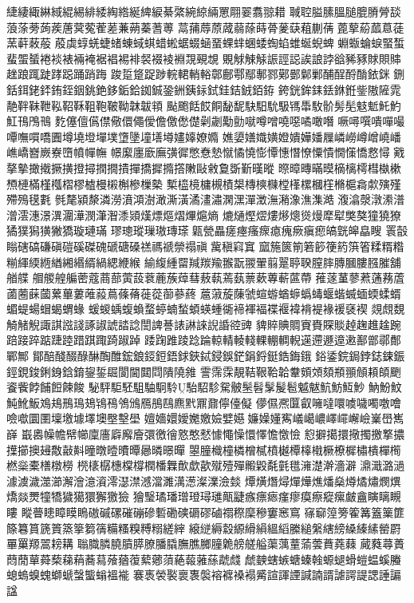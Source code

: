 緁緀緅綝緎緄緆緋緌綯綹綖綼綟綦綮綩綡緉罳翢翣翥翞耤
聝聜膉膆膃膇膍膌膋舕蒗蒤蒡蒟蒺蓎蓂蒬蒮蒫蒹蒴蓁蓍蒪
蒚蒱蓐蒝蒧蒻蒢蒔蓇蓌蒛蒩蒯蒨蓖蒘蒶蓏蒠蓗蓔蓒蓛蒰
蒑虡蜳蜣蜨蝫蝀蜮蜞蜡蜙蜛蝃蜬蝁蜾蝆蜠蜲蜪蜭蜼蜒蜺蜱
蜵蝂蜦蜧蜸蜤蜚蜰蜑裷裧裱裲裺裾裮裼裶裻裰裬裫覝覡覟
覞觩觫觨誫誙誋誒誏誖谽豨豩賕賏賗趖踉踂跿踍跽踊踃踇
踆踅跾踀踄輐輑輎輍鄣鄜鄠鄢鄟鄝鄚鄤鄡鄛酺酲酹酳銥銤
鉶銛鉺銠銔銪銍銦銚銫鉹銗鉿銣鋮銎銂銕銢鉽銈銡銊銆銌
銙銧鉾銇銩銝銋鈭隞隡雿靘靽靺靾鞃鞀鞂靻鞄鞁靿韎韍頖
颭颮餂餀餇馝馜駃馹馻馺駂馽駇骱髣髧鬾鬿魠魡魟鳱鳲鳵
麧僿儃儰僸儆儇僶僾儋儌僽儊劋劌勱勯噈噂噌嘵噁噊噉噆
噘噚噀嘳嘽嘬嘾嘸嘪嘺圚墫墝墱墠墣墯墬墥墡壿嫿嫴嫽嫷
嫶嬃嫸嬂嫹嬁嬇嬅嬏屧嶙嶗嶟嶒嶢嶓嶕嶠嶜嶡嶚嶞幩幝幠
幜緳廛廞廡彉徲憋憃慹憱憰憢憉憛憓憯憭憟憒憪憡憍慦憳
戭摮摰撖撠撅撗撜撏撋撊撌撣撟摨撱撘敶敺敹敻斲斳暵暰
暩暲暷暪暯樀樆樗槥槸樕槱槤樠槿槬槢樛樝槾樧槲槮樔槷
槧橀樈槦槻樍槼槫樉樄樘樥樏槶樦樇槴樖歑殥殣殢殦氁氀
毿氂潁漦潾澇濆澒澍澉澌潢潏澅潚澖潶潬澂潕潲潒潐潗澔
澓潝漀潡潫潽潧澐潓澋潩潿澕潣潷潪潻熲熯熛熰熠熚熩熵
熝熥熞熤熡熪熜熧熳犘犚獘獒獞獟獠獝獛獡獚獙獢璇璉璊
璆璁瑽璅璈瑼瑹甈甇畾瘥瘞瘙瘝瘜瘣瘚瘨瘛皜皝皞皛瞍
瞏瞉瞈磍碻磏磌磑磎磔磈磃磄磉禚禡禠禜禢禛歶稹窲窴
窳箷篋箾箬篎箯箹篊箵糅糈糌糋緷緛緪緧緗緡縃緺緦緶緱
緰緮緟罶羬羰羭翭翫翪翬翦翨聤聧膣膟膞膕膢膙膗舖艏艓
艒艐艎艑蔤蔻蔏蔀蔩蔎蔉蔍蔟蔊蔧蔜蓻蔫蓺蔈蔌蓴蔪蓲蔕
蓷蓫蓳蓼蔒蓪蓩蔖蓾蔨蔝蔮蔂蓽蔞蓶蔱蔦蓧蓨蓰蓯蓹蔘蔠
蔰蔋蔙蔯虢蝖蝣蝤蝷蟡蝳蝘蝔蝛蝒蝡蝚蝑蝞蝭蝪蝐蝎蝟蝝
蝯蝬蝺蝮蝜蝥蝏蝻蝵蝢蝧蝩衚褅褌褔褋褗褘褙褆褖褑褎褉
覢覤覣觭觰觬諏諆誸諓諑諔諕誻諗誾諀諅諘諃誺誽諙谾豍
貏賥賟賙賨賚賝賧趠趜趡趛踠踣踥踤踮踕踛踖踑踙踦踧踔
踒踘踓踜踗踚輬輤輘輚輠輣輖輗遳遰遯遧遫鄯鄫鄩鄪鄲鄦
鄮醅醆醊醁醂醄醀鋐鋃鋄鋀鋙銶鋏鋱鋟鋘鋩鋗鋝鋌鋯鋂鋨
鋊鋈鋎鋦鋍鋕鋉鋠鋞鋧鋑鋓銵鋡錥鋆銴镼閬閫閮閰隤隢雓
霅霈霂靚鞊鞎鞈韐韏頞頝頦頩頨頠頛頧颲餈飺餑餔餖餗餕
駜駍駏駓駔駎駉駖駘駋駗駌骳髬髫髳髲髱魆魃魧魴魱魦
魶魵魰魨魤魬鳼鳺鳽鳿鳷鴇鴀鳹鳻鴈鴅鴄麃黓鼏鼐儜儓儗
儚儑凞匴叡噰噠噮噳噦噣噭噲噞噷圜圛壈墽壉墿墺壂墼壆
嬗嬙嬛嬡嬔嬓嬐嬖嬨嬚嬠嬞寯嶬嶱嶩嶧嶵嶰嶮嶪嶨嶲嶭
嶯嶴幧幨幦幯廩廧廦廨廥彋徼徻憝憨憖懅憴懆懁懌憺憿憸
憌擗擖擐擏擉撽撉擃擛擳擙攳敿敼斢曈暾曀曊曋曏暽暻暺
曌朣樴橦橉橧樲橨樾橝橭橶橛橑樨橚樻樿橁橪橤橐橏橔橯
橩橠樼橞橖橕橍橎橆歕歔歖殧殪殫毈毇氄氃氆澭濋澣濇澼
濎濈潞濄澽澞濊澨瀄澥澮澺澬澪濏澿澸澢濉澫濍澯澲澰燅
燂熿熸燖燀燁燋燔燊燇燏熽燘熼燆燚燛犝犞獩獦獧獬獥獫
獪瑿璚璠璔璒璕璡甋疀瘯瘭瘱瘽瘳瘼瘵瘲瘰皻盦瞚瞝瞡瞜
瞛瞢瞣瞕瞙瞗磝磩磥磪磞磣磛磡磢磭磟磠禤穄穈穇窶窸窵
窱窷篞篣篧篝篕篥篚篨篹篔篪篢篜篫篘篟糒糔糗糐糑縒縡
縗縌縟縠縓縎縜縕縚縢縋縏縖縍縔縥縤罃罻罼罺羱翯耪耩
聬膱膦膮膹膵膫膰膬膴膲膷膧臲艕艖艗蕖蕅蕫蕍蕓蕡蕘蕀
蕆蕤蕁蕢蕄蕑蕇蕣蔾蕛蕱蕎蕮蕵蕕蕧蕠薌蕦蕝蕔蕥蕬虣虥
虤螤螛螏螗螓螒螈螁螖螘蝹螇螣螅螐螑螝螄螔螜螚螉褞褦
褰褭褮褧褱褢褩褣褯褬褟觱諠諢諲諴諵諝謔諤諟諰諈諞諡

